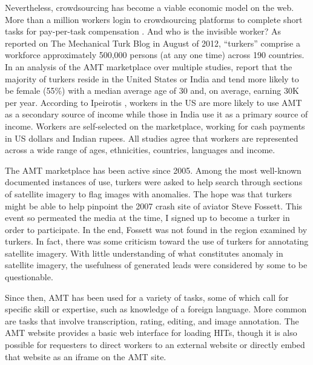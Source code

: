 Nevertheless, crowdsourcing has become a viable economic model on the web. More than a million workers login to crowdsourcing platforms to complete short tasks for pay-per-task compensation  \citep{Munro:2011tm}.  And who is the invisible worker? As reported on The Mechanical Turk Blog in August of 2012, ``turkers'' comprise a workforce approximately 500,000 persons (at any one time) across 190 countries. In an analysis of the AMT marketplace over multiple studies,  \cite{Mason:2011cl}  report that the majority of turkers reside in the United States or India and tend more likely to be female (55\%) with a median average age of 30 and, on average, earning 30K per year. According to Ipeirotis  \citeyearpar{Ipeirotis:2010tt,Ipeirotis:2010jo},  workers in the US are more likely to use AMT as a secondary source of income while those in India use it as a primary source of income. Workers are self-selected on the marketplace, working for cash payments in US dollars and Indian rupees. All studies agree that workers are represented across a wide range of ages, ethnicities, countries, languages and income.

The AMT marketplace has been active since 2005. Among the most well-known documented instances of use, turkers were asked to help search through sections of satellite imagery to flag images with anomalies. The hope was that turkers might be able to help pinpoint the 2007 crash site of aviator Steve Fossett. This event so permeated the media at the time, I signed up to become a turker in order to participate. In the end, Fossett was not found in the region examined by turkers. In fact, there was some criticism toward the use of turkers for annotating satellite imagery. With little understanding of what constitutes anomaly in satellite imagery, the usefulness of generated leads were considered by some to be questionable.

Since then, AMT has been used for a variety of tasks, some of which call for specific skill or expertise, such as knowledge of a foreign language. More common are tasks that involve transcription, rating, editing, and image annotation. The AMT website provides a basic web interface for loading HITs, though it is also possible for requesters to direct workers to an external website or directly embed that website as an iframe on the AMT site.

